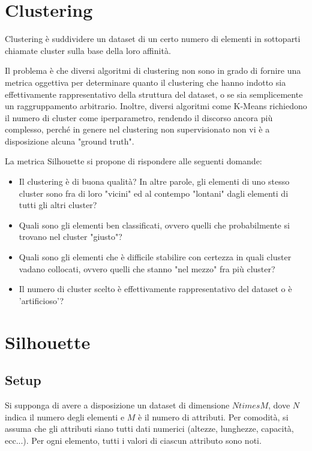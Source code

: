 \documentclass[italian]{article}
\begin{document}
	\section{Clustering}

		Clustering è suddividere un dataset di un certo numero di elementi
		in sottoparti chiamate cluster sulla base della loro affinità.

		Il problema è che diversi algoritmi di clustering non sono in grado di
		fornire una metrica oggettiva per determinare quanto il clustering che
		hanno indotto sia effettivamente rappresentativo della struttura del
		dataset, o se sia semplicemente un raggruppamento arbitrario. Inoltre,
		diversi algoritmi come K-Means richiedono il numero di cluster come
		iperparametro, rendendo il discorso ancora più complesso, perché in
		genere nel clustering non supervisionato non vi è a disposizione
		alcuna "ground truth".

		La metrica Silhouette si propone di rispondere alle seguenti domande:

		\begin{itemize}
			\item
			Il clustering è di buona qualità? In altre parole, gli elementi di
			uno stesso cluster sono fra di loro "vicini" ed al contempo "lontani"
			dagli elementi di tutti gli altri cluster?
			\item
			Quali sono gli elementi ben classificati, ovvero quelli che probabilmente
			si trovano nel cluster "giusto"?
			\item
			Quali sono gli elementi che è difficile stabilire con certezza in quali
			cluster vadano collocati, ovvero quelli che stanno "nel mezzo" fra più
			cluster?
			\item
			Il numero di cluster scelto è effettivamente rappresentativo del dataset
			o è 'artificioso'?
		\end{itemize}

	\section{Silhouette}

		\subsection{Setup}

			Si supponga di avere a disposizione un dataset di dimensione
			$N times M$, dove $N$ indica il numero degli elementi e $M$ è
			il numero di attributi. Per comodità, si assuma che gli attributi
			siano tutti dati numerici (altezze, lunghezze, capacità, ecc...).
			Per ogni elemento, tutti i valori di ciascun attributo sono noti.
\end{document}
